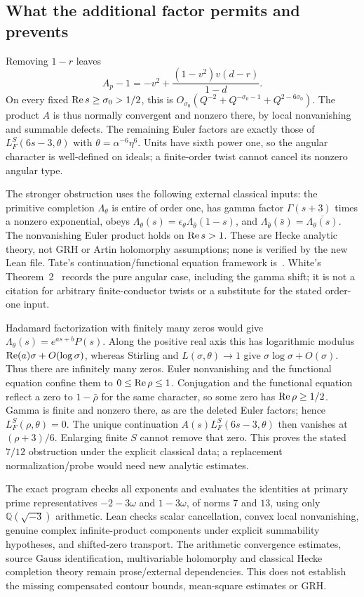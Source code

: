 \subsection{What the additional factor permits and prevents}
Removing $1-r$ leaves
\[
 A_p-1=-v^2+\frac{(1-v^2)v(d-r)}{1-d}.
\]
On every fixed $\operatorname{Re} s\ge\sigma_0>1/2$, this is
$O_{\sigma_0}(Q^{-2}+Q^{-\sigma_0-1}+Q^{2-6\sigma_0})$.
The product $A$ is thus normally convergent and nonzero there, by local
nonvanishing and summable defects. The remaining Euler factors are exactly
those of $L_F^S(6s-3,\theta)$ with
$\theta=\alpha^{-6}\eta^6$. Units have sixth power one, so the angular
character is well-defined on ideals; a finite-order twist cannot cancel
its nonzero angular type.

The stronger obstruction uses the following external classical inputs:
the primitive completion $\Lambda_\theta$ is entire of order one,
has gamma factor $\Gamma(s+3)$ times a nonzero exponential, obeys
$\Lambda_\theta(s)=\epsilon_\theta\Lambda_{\bar\theta}(1-s)$, and
$\Lambda_{\bar\theta}(\bar s)=\overline{\Lambda_\theta(s)}$.
The nonvanishing Euler product holds on $\operatorname{Re} s>1$.
These are Hecke analytic theory, not GRH or Artin holomorphy assumptions;
none is verified by the new Lean file. Tate's continuation/functional
equation framework is~\cite[sections 4.4--4.5]{tate}.
White's Theorem~2~\cite{white} records the pure angular case, including
the gamma shift; it is not a citation for arbitrary finite-conductor
twists or a substitute for the stated order-one input.

Hadamard factorization with finitely many zeros would give
$\Lambda_\theta(s)=e^{as+b}P(s)$. Along the positive real axis this
has logarithmic modulus $\operatorname{Re}(a)\sigma+O(\log\sigma)$, whereas
Stirling and $L(\sigma,\theta)\to1$ give
$\sigma\log\sigma+O(\sigma)$. Thus there are infinitely many zeros.
Euler nonvanishing and the functional equation confine them to
$0\le\operatorname{Re}\rho\le1$. Conjugation and the functional equation reflect
a zero to $1-\bar\rho$ for the same character, so some zero has
$\operatorname{Re}\rho\ge1/2$. Gamma is finite and nonzero there, as are the
deleted Euler factors; hence $L_F^S(\rho,\theta)=0$.
The unique continuation $A(s)L_F^S(6s-3,\theta)$ then vanishes at
$(\rho+3)/6$. Enlarging finite $S$ cannot remove that zero.
This proves the stated $7/12$ obstruction under the explicit classical
data; a replacement normalization/probe would need new analytic estimates.

The exact program  checks all
exponents and evaluates the identities at primary prime representatives
$-2-3\omega$ and $1-3\omega$, of norms $7$ and $13$, using only
$\mathbb Q(\sqrt{-3})$ arithmetic. Lean checks scalar cancellation,
convex local nonvanishing, genuine complex infinite-product components
under explicit summability hypotheses, and shifted-zero transport.
The arithmetic convergence estimates, source Gauss identification,
multivariable holomorphy and classical Hecke completion theory remain
prose/external dependencies. This does not establish the missing
compensated contour bounds, mean-square estimates or GRH.

